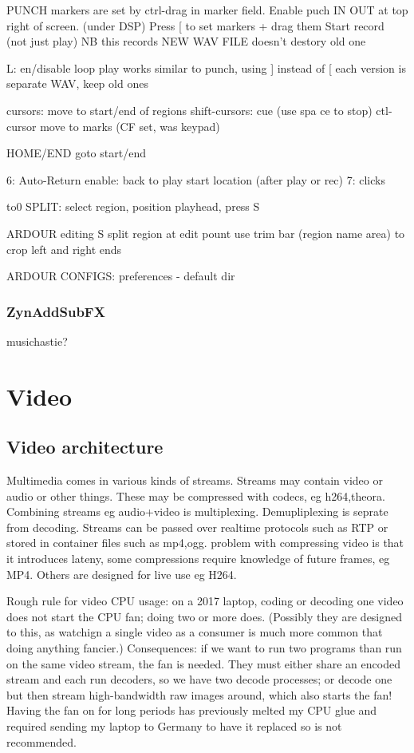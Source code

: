 \documentclass[oneside,english]{scrbook}
\begin{document}
PUNCH markers are set by ctrl-drag in marker field. 
	Enable puch IN OUT at top right of screen. (under DSP) 
	Press [ to set markers + drag them
	Start record (not just play)
	NB this records NEW WAV FILE doesn't destory old one
 
L: 	en/disable loop play
	works similar to punch, using ] instead of [
	each version is separate WAV, keep old ones	

cursors: 	move to start/end of regions
shift-cursors: 	cue (use spa  ce to stop)
ctl-cursor 	move to marks (CF set, was keypad)

HOME/END goto start/end

6: Auto-Return enable: back to play start location (after play or rec)
7: clicks

to0 SPLIT: select region, position playhead, press S


ARDOUR editing
	S split region at edit pount
	use trim bar (region name area) to crop left and right ends

ARDOUR CONFIGS:
	preferences - default dir

\section{ZynAddSubFX}

musichastie?


\part{Video}


\chapter{Video architecture}

Multimedia comes in various kinds of streams. Streams may contain
video or audio or other things. These may be compressed with codecs,
eg h264,theora. Combining streams eg audio+video is multiplexing.
Demupliplexing is seprate from decoding. Streams can be passed over
realtime protocols such as RTP or stored in container files such as
mp4,ogg. problem with compressing video is that it introduces lateny,
some compressions require knowledge of future frames, eg MP4. Others
are designed for live use eg H264. 

Rough rule for video CPU usage: on a 2017 laptop, coding or decoding one video does not start the CPU fan; doing two or more does. (Possibly they are designed to this, as watchign a single video as a consumer is much more common that doing anything fancier.)  Consequences: if we want to run two programs than run on the same video stream, the fan is needed. They must either share an encoded stream and each run decoders, so we have two decode processes; or decode one but then stream high-bandwidth raw images around, which also starts the fan! Having the fan on for long periods has previously melted my CPU glue and required sending my laptop to Germany to have it replaced so is not recommended.
\end{document}

